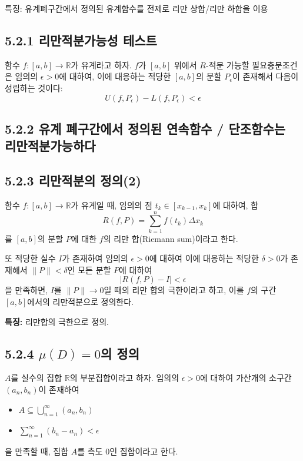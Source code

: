 \documentclass{article}
\begin{document}
특징: 유계폐구간에서 정의된 유계함수를 전제로 리만 상합/리만 하합을 이용


\subsection*{5.2.1 리만적분가능성 테스트}

함수 \( f: [a, b] \to \mathbb{R} \)가 유계라고 하자. \( f \)가 \( [a, b] \) 위에서 \({R} \)-적분 가능할 필요충분조건은 임의의 \( \epsilon > 0 \)에 대하여, 이에 대응하는 적당한 \( [a, b] \)의 분할 \( P_\epsilon \)이 존재해서 다음이 성립하는 것이다:
\[
U(f, P_\epsilon) - L(f, P_\epsilon) < \epsilon
\]

\subsection*{5.2.2 유계 폐구간에서 정의된 연속함수 / 단조함수는 리만적분가능하다}

\subsection*{5.2.3 리만적분의 정의(2)}

함수 \( f: [a, b] \to \mathbb{R} \)가 유계일 때, 임의의 점 \( t_k \in [x_{k-1}, x_k] \)에 대하여, 합
\[
R(f, P) = \sum_{k=1}^{n} f(t_k) \Delta x_k
\]
를 \( [a, b] \)의 분할 \( P \)에 대한 \( f \)의 리만 합(Riemann sum)이라고 한다.

또 적당한 실수 \( I \)가 존재하여 임의의 \( \epsilon > 0 \)에 대하여 이에 대응하는 적당한 \( \delta > 0 \)가 존재해서 \( \|P\| < \delta \)인 모든 분할 \( P \)에 대하여
\[
| R(f, P) - I | < \epsilon
\]
을 만족하면, \( I \)를 \( \|P\| \to 0 \)일 때의 리만 합의 극한이라고 하고, 이를 \( f \)의 구간 \( [a, b] \)에서의 리만적분으로 정의한다.

\textbf{특징:} 리만합의 극한으로 정의.

\subsection*{5.2.4 \( \mu(D) = 0 \)의 정의}

\( A \)를 실수의 집합 \( \mathbb{R} \)의 부분집합이라고 하자. 임의의 \( \epsilon > 0 \)에 대하여 가산개의 소구간 \( (a_n, b_n) \)이 존재하여
\begin{itemize}
    \item \( A \subseteq \bigcup_{n=1}^{\infty} (a_n, b_n) \)
    \item \( \sum_{n=1}^{\infty} (b_n - a_n) < \epsilon \)
\end{itemize}
을 만족할 때, 집합 \( A \)를 측도 0인 집합이라고 한다.
\end{document}
